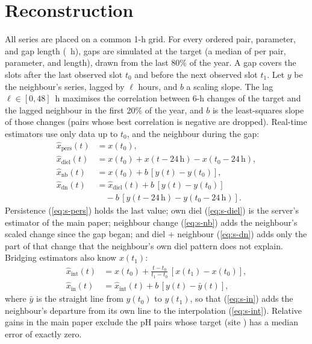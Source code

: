 \documentclass[journal]{IEEEtran}
\begin{document}
\section{Reconstruction}
\label{sec:s-reconstruct}
All series are placed on a common 1-h grid. For every ordered pair, parameter, and gap length (\chainGaps~h), gaps are simulated at the target (a median of \chainOutages{} per pair, parameter, and length), drawn from the last 80\% of the year. A gap covers the slots after the last observed slot $t_0$ and before the next observed slot $t_1$. Let $y$ be the neighbour's series, lagged by $\ell$ hours, and $b$ a scaling slope. The lag $\ell\in[0,48]$~h maximises the correlation between 6-h changes of the target and the lagged neighbour in the first 20\% of the year, and $b$ is the least-squares slope of those changes (pairs whose best correlation is negative are dropped). Real-time estimators use only data up to $t_0$, and the neighbour during the gap:
\begin{align}
\hat{x}_\mathrm{pers}(t)&=x(t_0), \label{eq:s-pers}\\
\hat{x}_\mathrm{diel}(t)&=x(t_0)+x(t-24\,\mathrm{h})-x(t_0-24\,\mathrm{h}), \label{eq:s-diel}\\
\hat{x}_\mathrm{nb}(t)&=x(t_0)+b\,[y(t)-y(t_0)], \label{eq:s-nb}\\
\hat{x}_\mathrm{dn}(t)&=\hat{x}_\mathrm{diel}(t)+b\,[y(t)-y(t_0)] \nonumber\\
&\quad-b\,[y(t-24\,\mathrm{h})-y(t_0-24\,\mathrm{h})]. \label{eq:s-dn}
\end{align}
Persistence (\ref{eq:s-pers}) holds the last value; own diel (\ref{eq:s-diel}) is the server's estimator of the main paper; neighbour change (\ref{eq:s-nb}) adds the neighbour's scaled change since the gap began; and diel + neighbour (\ref{eq:s-dn}) adds only the part of that change that the neighbour's own diel pattern does not explain. Bridging estimators also know $x(t_1)$:
\begin{align}
\hat{x}_\mathrm{int}(t)&=x(t_0)+\frac{t-t_0}{t_1-t_0}\,[x(t_1)-x(t_0)], \label{eq:s-int}\\
\hat{x}_\mathrm{in}(t)&=\hat{x}_\mathrm{int}(t)+b\,[y(t)-\bar{y}(t)], \label{eq:s-in}
\end{align}
where $\bar{y}$ is the straight line from $y(t_0)$ to $y(t_1)$, so that (\ref{eq:s-in}) adds the neighbour's departure from its own line to the interpolation (\ref{eq:s-int}). Relative gains in the main paper exclude the \chainGainExcluded{} pH pairs whose target (site \chainExclSite) has a median error of exactly zero.
\end{document}
